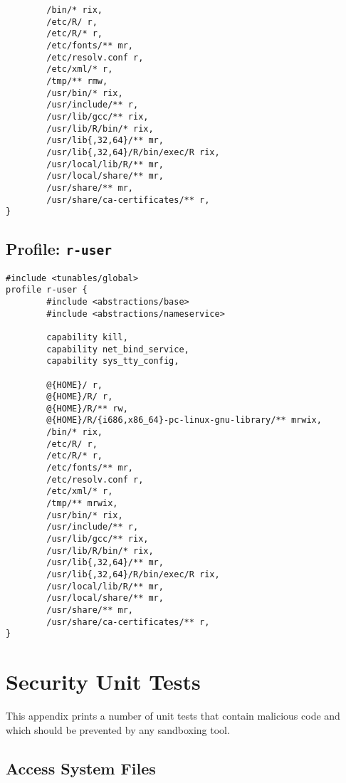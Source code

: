 \documentclass[article]{jss}
\begin{document}
\begin{appendices}
\begin{verbatim}
        /bin/* rix,
        /etc/R/ r,
        /etc/R/* r,
        /etc/fonts/** mr,
        /etc/resolv.conf r,
        /etc/xml/* r,
        /tmp/** rmw,    
        /usr/bin/* rix,
        /usr/include/** r,       
        /usr/lib/gcc/** rix,		 
        /usr/lib/R/bin/* rix,
        /usr/lib{,32,64}/** mr,
        /usr/lib{,32,64}/R/bin/exec/R rix,
        /usr/local/lib/R/** mr,
        /usr/local/share/** mr,
        /usr/share/** mr,
        /usr/share/ca-certificates/** r,
}
\end{verbatim}

\subsection[Profile: r-user]{Profile: \texttt{r-user}}
\label{r-user}

\begin{verbatim}
#include <tunables/global>
profile r-user {
        #include <abstractions/base>
        #include <abstractions/nameservice>
	
        capability kill,
        capability net_bind_service,
        capability sys_tty_config,
	
        @{HOME}/ r,
        @{HOME}/R/ r,
        @{HOME}/R/** rw,
        @{HOME}/R/{i686,x86_64}-pc-linux-gnu-library/** mrwix,
        /bin/* rix,
        /etc/R/ r,
        /etc/R/* r,
        /etc/fonts/** mr,
        /etc/resolv.conf r,
        /etc/xml/* r,
        /tmp/** mrwix,
        /usr/bin/* rix,
        /usr/include/** r,       
        /usr/lib/gcc/** rix,		
        /usr/lib/R/bin/* rix,
        /usr/lib{,32,64}/** mr,
        /usr/lib{,32,64}/R/bin/exec/R rix,
        /usr/local/lib/R/** mr,
        /usr/local/share/** mr,
        /usr/share/** mr,
        /usr/share/ca-certificates/** r,
}
\end{verbatim}



\section{Security Unit Tests}

This appendix prints a number of unit tests that contain malicious code and
which should be prevented by any sandboxing tool.

\subsection{Access System Files}


\end{appendices}
\end{document}
